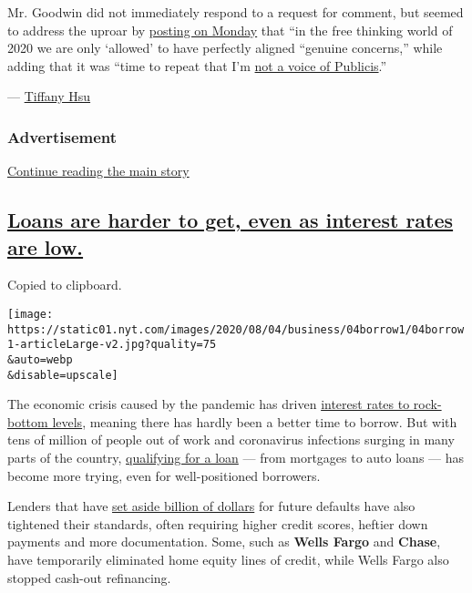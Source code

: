 Mr. Goodwin did not immediately respond to a request for comment, but
seemed to address the uproar by
\href{https://twitter.com/tomfgoodwin/status/1290340999672332291}{posting
on Monday} that ``in the free thinking world of 2020 we are only
`allowed' to have perfectly aligned ``genuine concerns,'' while adding
that it was ``time to repeat that I'm
\href{https://twitter.com/tomfgoodwin/status/1290325449529274370?s=20}{not
a voice of Publicis}.''

--- \href{https://www.nytimes.com/by/tiffany-hsu}{Tiffany Hsu}

\hypertarget{advertisement-1}{%
\subsubsection{Advertisement}\label{advertisement-1}}

\protect\hyperlink{after-dfp-ad-mid2}{Continue reading the main story}

\hypertarget{loans-are-harder-to-get-even-as-interest-rates-are-low}{%
\subsection{\texorpdfstring{\protect\hyperlink{loans-are-harder-to-get-even-as-interest-rates-are-low}{Loans
are harder to get, even as interest rates are
low.}}{Loans are harder to get, even as interest rates are low.}}\label{loans-are-harder-to-get-even-as-interest-rates-are-low}}

Copied to clipboard.

\texttt{[image: https://static01.nyt.com/images/2020/08/04/business/04borrow1/04borrow1-articleLarge-v2.jpg?quality=75\\\&auto=webp\\\&disable=upscale]}

The economic crisis caused by the pandemic has driven
\href{https://www.nytimes.com/2020/07/16/business/mortgage-rates-below-3-percent.html}{interest
rates to rock-bottom levels}, meaning there has hardly been a better
time to borrow. But with tens of million of people out of work and
coronavirus infections surging in many parts of the country,
\href{https://www.nytimes.com/2020/08/04/your-money/mortgage-loans-credit-cards-coronavirus.html}{qualifying
for a loan} --- from mortgages to auto loans --- has become more trying,
even for well-positioned borrowers.

Lenders that have
\href{https://www.nytimes.com/2020/07/14/business/big-banks-quarterly-results.html}{set
aside billion of dollars} for future defaults have also tightened their
standards, often requiring higher credit scores, heftier down payments
and more documentation. Some, such as \textbf{Wells Fargo} and
\textbf{Chase}, have temporarily eliminated home equity lines of credit,
while Wells Fargo also stopped cash-out refinancing.

